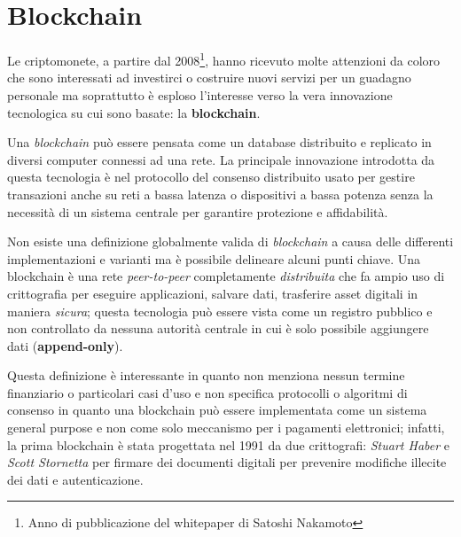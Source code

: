\chapter{Blockchain}
Le criptomonete, a partire dal 2008\footnote{Anno di pubblicazione del whitepaper di Satoshi Nakamoto}, hanno ricevuto molte attenzioni da coloro che sono interessati ad investirci o costruire nuovi servizi per un guadagno personale ma soprattutto è esploso l'interesse verso la vera innovazione tecnologica su cui sono basate: la \textbf{blockchain}.

Una \textit{blockchain} può essere pensata come un database distribuito e replicato in diversi computer connessi ad una rete.\newline
La principale innovazione introdotta da questa tecnologia è nel protocollo del consenso distribuito usato per gestire transazioni anche su reti a bassa latenza o dispositivi a bassa potenza senza la necessità di un sistema centrale per garantire protezione e affidabilità.

Non esiste una definizione globalmente valida di \textit{blockchain} a causa delle differenti implementazioni e varianti ma è possibile delineare alcuni punti chiave.\newline
Una blockchain è una rete \textit{peer-to-peer} completamente \textit{distribuita} che fa ampio uso di crittografia per eseguire applicazioni, salvare dati, trasferire asset digitali in maniera \textit{sicura}; questa tecnologia può essere vista come un registro pubblico e non controllato da nessuna autorità centrale in cui è solo possibile aggiungere dati (\textbf{append-only}).

Questa definizione è interessante in quanto non menziona nessun termine finanziario o particolari casi d'uso e non specifica protocolli o algoritmi di consenso in quanto una blockchain può essere implementata come un sistema general purpose e non come solo meccanismo per i pagamenti elettronici; infatti, la prima blockchain è stata progettata nel 1991 da due crittografi: \textit{Stuart Haber} e \textit{Scott Stornetta} per firmare dei documenti digitali per prevenire modifiche illecite dei dati e autenticazione.\newline

